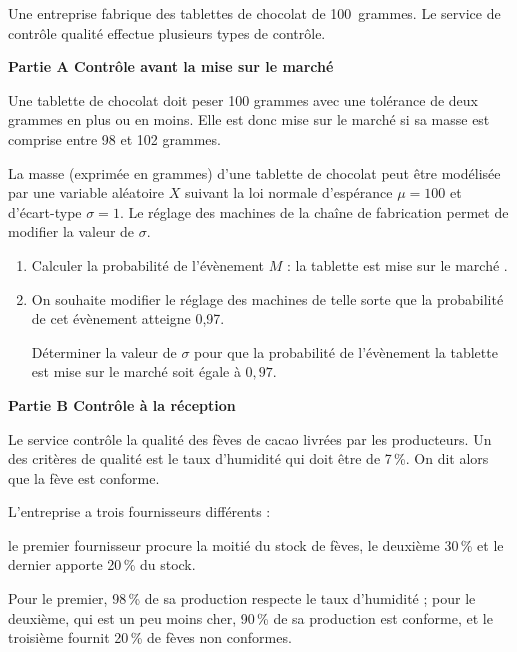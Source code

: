 \documentclass[12pt,french]{article}
\begin{document}
\begin{question}[subtitle={Amérique du Nord 2015}]
Une entreprise fabrique des tablettes de chocolat de 100~grammes. Le service de contrôle qualité effectue plusieurs types de contrôle. 

\bigskip

\textbf{Partie A Contrôle avant la mise sur le marché}

\medskip
 

Une tablette de chocolat doit peser 100 grammes avec une tolérance de deux grammes en plus ou en moins. Elle est donc mise sur le marché si sa masse est comprise entre 98 et 102 grammes. 

La masse (exprimée en grammes) d'une tablette de chocolat peut être modélisée par une variable aléatoire $X$ suivant la loi normale d'espérance $\mu = 100$ et d'écart-type $\sigma = 1$. Le réglage des machines de la chaîne de fabrication permet de modifier la valeur de $\sigma$. 

\medskip

\begin{enumerate}
\item Calculer la probabilité de l'évènement $M$ : \og la tablette est mise sur le marché \fg. 
\item On souhaite modifier le réglage des machines de telle sorte que la probabilité de cet évènement atteigne 0,97. 

Déterminer la valeur de $\sigma$ pour que la probabilité de l'évènement \og la tablette est mise sur le marché\fg{} soit égale à $0,97$. 
\end{enumerate}

\bigskip

\textbf{Partie B Contrôle à la réception}

\medskip 

Le service contrôle la qualité des fèves de cacao livrées par les producteurs. Un des critères de qualité est le taux d'humidité qui doit être de 7\,\%. On dit alors que la fève est conforme. 

L'entreprise a trois fournisseurs différents : 

le premier fournisseur procure la moitié du stock de fèves, le deuxième 30\,\% et le dernier apporte 20\,\% du stock. 

Pour le premier, 98\,\% de sa production respecte le taux d'humidité ; pour le deuxième, qui est un peu moins cher, 90\,\% de sa production est conforme, et le troisième fournit 20\,\% de fèves non conformes. 


\end{question}
\end{document}

